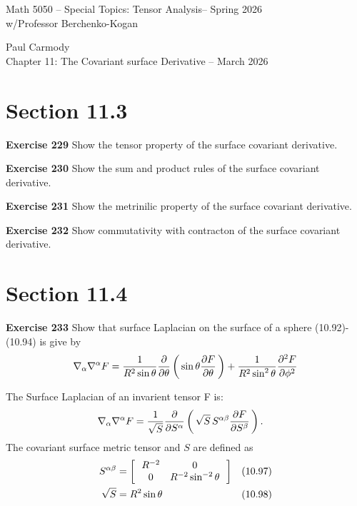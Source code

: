 \documentclass[12pt,a4paper]{report}
\newcommand{\CLASSNAME}{Math 5050 -- Special Topics: Tensor Analysis}
\newcommand{\STUDENTNAME}{Paul Carmody}
\newcommand{\ASSIGNMENT}{Chapter 11: The Covariant surface Derivative }
\newcommand{\DUEDATE}{March 2026}
\newcommand{\PROFESSOR}{Professor Berchenko-Kogan}
\newcommand{\SEMESTER}{Spring 2026}
\begin{document}
\begin{center}
	\Large{\CLASSNAME -- \SEMESTER} \\
	\large{ w/\PROFESSOR}
\end{center}
\begin{center}
	\STUDENTNAME \\
	\ASSIGNMENT -- \DUEDATE\\
\end{center} 

\begin{description}

\section*{Section 11.3}
\item \textbf{Exercise 229} Show the tensor property of the surface covariant derivative.
\item \textbf{Exercise 230} Show the sum and product rules of the surface covariant derivative.
\item \textbf{Exercise 231} Show the metrinilic property of the surface covariant derivative.
\item \textbf{Exercise 232} Show commutativity with contracton of the surface covariant derivative.
\section*{Section 11.4}
\item \textbf{Exercise 233} Show that surface Laplacian on the surface of a sphere (10.92)-(10.94) is give by 
\begin{align*}
	\nabla_\alpha\nabla^\alpha F = \frac{1}{R^2\sin\theta}\frac{\partial }{\partial \theta}\left (\, \sin\theta\frac{\partial F}{\partial \theta} \,\right )+\frac{1}{R^2\sin^2\theta}\frac{\partial^2 F}{\partial \phi^2}
\end{align*}

The Surface Laplacian of an invarient tensor F is:
\begin{align*}
	\nabla_\alpha\nabla^\alpha F &= \frac{1}{\sqrt{S}}\frac{\partial }{\partial S^\alpha}\left (\, \sqrt{S}\,S^{\alpha\beta}\frac{\partial F}{\partial S^\beta} \,\right ).
\end{align*}The covariant surface metric tensor and $S$ are defined as 
\begin{align*}
	S^{\alpha\beta} &= \left [\,  \begin{array}{c c} R^{-2}&0 \\ 0 & R^{-2}\sin^{-2}\theta \end{array}  \,\right ] & (10.97) \\
	\sqrt{S} &= R^2\sin\theta & (10.98)
\end{align*}


\end{description}
\end{document}
